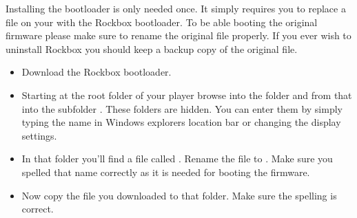 
Installing the bootloader is only needed once. It simply requires you
to replace a file on your \dap{} with the Rockbox bootloader. To be able
booting the original firmware please make sure to rename the original file
properly. If you ever wish to uninstall Rockbox you should keep a backup copy
of the original file.

\begin{itemize}
\item Download the Rockbox bootloader. 
\item Starting at the root folder of your player browse into the folder
   and from that into the subfolder .
  These folders are hidden. You can enter them by simply typing the name in
  Windows explorers location bar or changing the display settings.
\item In that folder you'll find a file called . Rename
  the file to . Make sure you spelled that name
  correctly as it is needed for booting the \playerman{} firmware.
\item Now copy the file  you downloaded to that folder.
  Make sure the spelling is correct.
\end{itemize}

